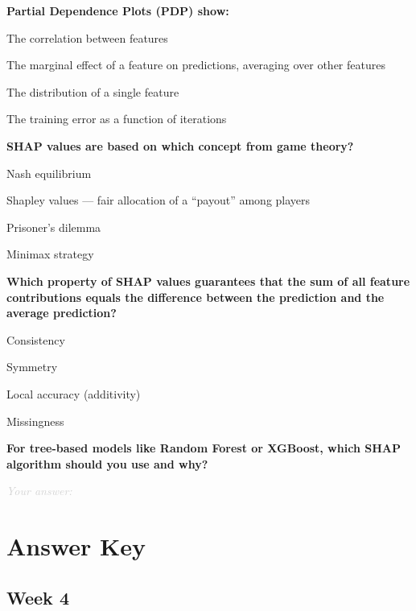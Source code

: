 \documentclass[11pt]{article}
\newcommand{\shortanswer}{%
  \vspace{0.3em}
  \textcolor{LightGray}{\textit{Your answer:} \hrulefill}
  \vspace{0.5em}
}
\begin{document}
\begin{questions}[resume]
\item \textbf{Partial Dependence Plots (PDP) show:}
\begin{options}
  \item The correlation between features
  \item The marginal effect of a feature on predictions, averaging over other features
  \item The distribution of a single feature
  \item The training error as a function of iterations
\end{options}

\item \textbf{SHAP values are based on which concept from game theory?}
\begin{options}
  \item Nash equilibrium
  \item Shapley values --- fair allocation of a ``payout'' among players
  \item Prisoner's dilemma
  \item Minimax strategy
\end{options}

\item \textbf{Which property of SHAP values guarantees that the sum of all feature contributions equals the difference between the prediction and the average prediction?}
\begin{options}
  \item Consistency
  \item Symmetry
  \item Local accuracy (additivity)
  \item Missingness
\end{options}

\item \textbf{For tree-based models like Random Forest or XGBoost, which SHAP algorithm should you use and why?}

\shortanswer

\end{questions}

\newpage
\section*{Answer Key}

\subsection*{Week 4}
\end{document}
